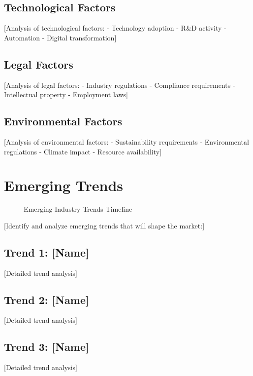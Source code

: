 \documentclass[11pt,letterpaper]{report}
\begin{document}
\subsection{Technological Factors}
[Analysis of technological factors:
- Technology adoption
- R\&D activity
- Automation
- Digital transformation]

\subsection{Legal Factors}
[Analysis of legal factors:
- Industry regulations
- Compliance requirements
- Intellectual property
- Employment laws]

\subsection{Environmental Factors}
[Analysis of environmental factors:
- Sustainability requirements
- Environmental regulations
- Climate impact
- Resource availability]

\section{Emerging Trends}


\begin{figure}[htbp]
\centering
\caption{Emerging Industry Trends Timeline}
\label{fig:trends}
\end{figure}

[Identify and analyze emerging trends that will shape the market:]

\subsection{Trend 1: [Name]}
[Detailed trend analysis]

\subsection{Trend 2: [Name]}
[Detailed trend analysis]

\subsection{Trend 3: [Name]}
[Detailed trend analysis]
\end{document}
